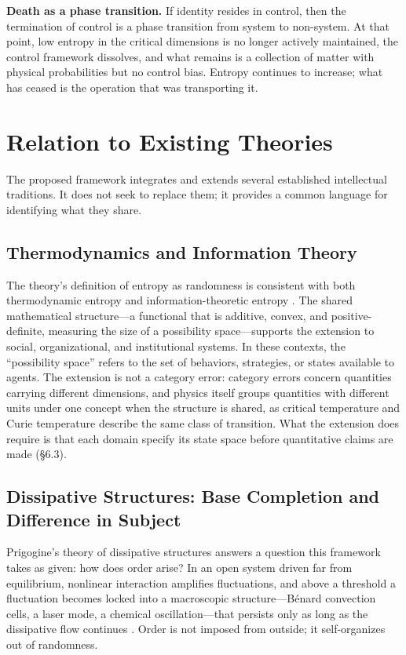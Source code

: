 \documentclass[11pt,a4paper]{article}
\begin{document}
\textbf{Death as a phase transition.} If identity resides in control, then the termination of control is a phase transition from system to non-system. At that point, low entropy in the critical dimensions is no longer actively maintained, the control framework dissolves, and what remains is a collection of matter with physical probabilities but no control bias. Entropy continues to increase; what has ceased is the operation that was transporting it.

\section{Relation to Existing Theories}

The proposed framework integrates and extends several established intellectual traditions. It does not seek to replace them; it provides a common language for identifying what they share.

\subsection{Thermodynamics and Information Theory}

The theory's definition of entropy as randomness is consistent with both thermodynamic entropy \citep{boltzmann1877, gibbs1878} and information-theoretic entropy \citep{shannon1948}. The shared mathematical structure---a functional that is additive, convex, and positive-definite, measuring the size of a possibility space---supports the extension to social, organizational, and institutional systems. In these contexts, the ``possibility space'' refers to the set of behaviors, strategies, or states available to agents. The extension is not a category error: category errors concern quantities carrying different dimensions, and physics itself groups quantities with different units under one concept when the structure is shared, as critical temperature and Curie temperature describe the same class of transition. What the extension does require is that each domain specify its state space before quantitative claims are made (\S6.3).

\subsection{Dissipative Structures: Base Completion and Difference in Subject}

Prigogine's theory of dissipative structures answers a question this framework takes as given: how does order arise? In an open system driven far from equilibrium, nonlinear interaction amplifies fluctuations, and above a threshold a fluctuation becomes locked into a macroscopic structure---Bénard convection cells, a laser mode, a chemical oscillation---that persists only as long as the dissipative flow continues \citep{nicolis1977, prigogine1984}. Order is not imposed from outside; it self-organizes out of randomness.
\end{document}
